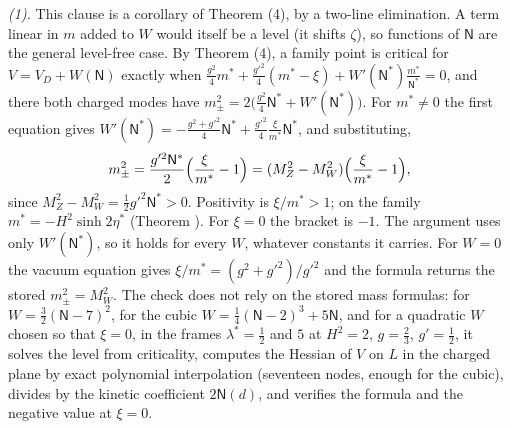 \emph{(1).} This clause is a corollary of Theorem (4), by a two-line elimination. A term linear in $m$ added to $W$ would itself be a level (it shifts $\zeta$), so functions of $\mathsf{N}$ are the general level-free case. By Theorem (4), a family point is critical for $V = V_{D} + W(\mathsf{N})$ exactly when $\tfrac{g^{2}}{4}m^{*} + \tfrac{g'^{2}}{4}(m^{*} - \xi) + W'(\mathsf{N}^{*})\tfrac{m^{*}}{\mathsf{N}^{*}} = 0$, and there both charged modes have $m_{\pm}^{2} = 2\bigl(\tfrac{g^{2}}{4}\mathsf{N}^{*} + W'(\mathsf{N}^{*})\bigr)$. For $m^{*} \neq 0$ the first equation gives $W'(\mathsf{N}^{*}) = -\tfrac{g^{2} + g'^{2}}{4}\mathsf{N}^{*} + \tfrac{g'^{2}}{4}\tfrac{\xi}{m^{*}}\mathsf{N}^{*}$, and substituting,
\[
m_{\pm}^{2} = \frac{g'^{2}\mathsf{N}^{*}}{2}\Bigl(\frac{\xi}{m^{*}} - 1\Bigr) = (M_{Z}^{2} - M_{W}^{2})\Bigl(\frac{\xi}{m^{*}} - 1\Bigr),
\]
since $M_{Z}^{2} - M_{W}^{2} = \tfrac12 g'^{2}\mathsf{N}^{*} > 0$. Positivity is $\xi/m^{*} > 1$; on the family $m^{*} = -H^{2}\sinh 2\eta^{*}$ (Theorem ). For $\xi = 0$ the bracket is $-1$. The argument uses only $W'(\mathsf{N}^{*})$, so it holds for every $W$, whatever constants it carries. For $W = 0$ the vacuum equation gives $\xi/m^{*} = (g^{2} + g'^{2})/g'^{2}$ and the formula returns the stored $m_{\pm}^{2} = M_{W}^{2}$. The check does not rely on the stored mass formulas: for $W = \tfrac32(\mathsf{N} - 7)^{2}$, for the cubic $W = \tfrac14(\mathsf{N} - 2)^{3} + 5\mathsf{N}$, and for a quadratic $W$ chosen so that $\xi = 0$, in the frames $\lambda^{*} = \tfrac12$ and $5$ at $H^{2} = 2$, $g = \tfrac23$, $g' = \tfrac12$, it solves the level from criticality, computes the Hessian of $V$ on $L$ in the charged plane by exact polynomial interpolation (seventeen nodes, enough for the cubic), divides by the kinetic coefficient $2\mathsf{N}(d)$, and verifies the formula and the negative value at $\xi = 0$.

